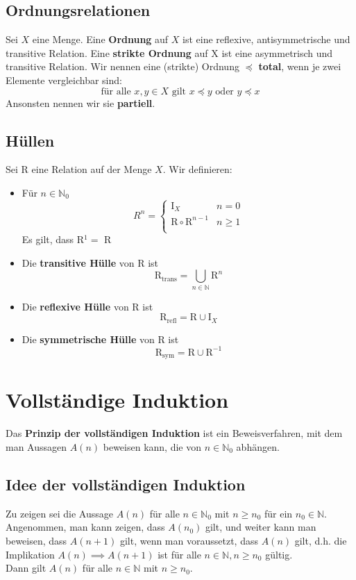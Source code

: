 \documentclass[12pt]{article}
\begin{document}
\subsection{Ordnungsrelationen}
Sei $X$ eine Menge. Eine \textbf{Ordnung} auf $X$ ist eine reflexive, antisymmetrische und transitive Relation. Eine \textbf{strikte Ordnung} auf X ist eine asymmetrisch und transitive Relation. Wir nennen eine (strikte) Ordnung $\preceq$ \textbf{total}, wenn je zwei Elemente vergleichbar sind: 
\[\text{für alle } x,y \in X \text{ gilt } x \preceq y \text{ oder } y \preceq x\]
Ansonsten nennen wir sie \textbf{partiell}.
\subsection{Hüllen}
Sei R eine Relation auf der Menge $X$. Wir definieren:
\begin{itemize}
    \item Für $n \in \mathbb{N}_0$ \[R^n = \begin{cases}
        \text{I}_X & n = 0 \\
        \text{R} \circ \text{R}^{n-1} & n \geq 1 \\
    \end{cases}\] Es gilt, dass R$^1 = $ R
    \item Die \textbf{transitive Hülle} von R ist \[\text{R}_{\text{trans}} = \bigcup_{n\in\mathbb{N}} \text{R}^n\]
    \item Die \textbf{reflexive Hülle} von R ist \[\text{R}_{\text{refl}} = \text{R} \cup \text{I}_X\]
    \item Die \textbf{symmetrische Hülle} von R ist \[\text{R}_{\text{sym}} = \text{R} \cup \text{R}^{-1}\]
\end{itemize}

\newpage
\section{Vollständige Induktion}
Das \textbf{Prinzip der vollständigen Induktion} ist ein Beweisverfahren, mit dem man Aussagen $A(n)$ beweisen kann, die von $n \in \mathbb{N}_0$ abhängen.
\subsection{Idee der vollständigen Induktion}
Zu zeigen sei die Aussage $A(n)$ für alle $n \in \mathbb{N}_0$ mit $n \geq n_0$ für ein $n_0 \in \mathbb{N}$. \\
Angenommen, man kann zeigen, dass $A(n_0)$ gilt, und weiter kann man beweisen, dass $A(n+1)$ gilt, wenn man voraussetzt, dass $A(n)$ gilt, d.h. die Implikation $A(n) \implies A(n + 1)$ ist für alle $n \in \mathbb{N}, n \geq n_0$ gültig. \\
Dann gilt $A(n)$ für alle $n \in \mathbb{N}$ mit $n \geq n_0$.\\
\end{document}
